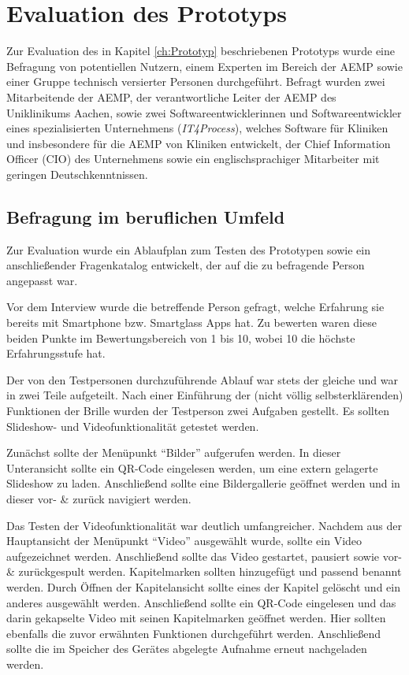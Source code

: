 %
%
%
%
%
%
\chapter{Evaluation des Prototyps}
\label{ch:Evaluation_des_Prototyps}
Zur Evaluation des in Kapitel \ref{ch:Prototyp} beschriebenen Prototyps wurde eine Befragung von potentiellen Nutzern, einem Experten im Bereich der AEMP sowie einer Gruppe technisch versierter Personen durchgeführt. Befragt wurden zwei
Mitarbeitende der AEMP, 
der verantwortliche Leiter der AEMP des Uniklinikums Aachen, 
sowie zwei Softwareentwicklerinnen und Softwareentwickler eines spezialisierten Unternehmens (\emph{IT4Process}), welches Software für Kliniken und insbesondere für die AEMP von Kliniken entwickelt, der Chief Information Officer (CIO) des Unternehmens sowie ein englischsprachiger Mitarbeiter mit geringen Deutschkenntnissen.
%
%
%
%
%
%
%
\section{Befragung im beruflichen Umfeld}
\label{sec:Befragung_im_Beruflichen_Umfeld}
Zur Evaluation wurde ein Ablaufplan zum Testen des Prototypen sowie ein anschließender Fragenkatalog entwickelt, der auf die zu befragende Person angepasst war. 

Vor dem Interview wurde die betreffende Person gefragt, welche Erfahrung sie bereits mit Smartphone bzw. Smartglass Apps hat. Zu bewerten waren diese beiden Punkte im Bewertungsbereich von 1 bis 10, wobei 10 die höchste Erfahrungsstufe hat.

Der von den Testpersonen durchzuführende Ablauf war stets der gleiche und war in zwei Teile aufgeteilt. Nach einer Einführung der (nicht völlig selbsterklärenden) Funktionen der Brille wurden der Testperson zwei Aufgaben gestellt. Es sollten Slideshow- und Videofunktionalität getestet werden. 

Zunächst sollte der Menüpunkt \enquote{Bilder} aufgerufen werden. In dieser Unteransicht sollte ein QR-Code eingelesen werden, um eine extern gelagerte Slideshow zu laden. Anschließend sollte eine Bildergallerie geöffnet werden und in dieser vor- \& zurück navigiert werden.

Das Testen der Videofunktionalität war deutlich umfangreicher. Nachdem aus der Hauptansicht der Menüpunkt \enquote{Video} ausgewählt wurde, sollte ein Video aufgezeichnet werden. Anschließend sollte das Video gestartet, pausiert sowie vor- \& zurückgespult werden. Kapitelmarken sollten hinzugefügt und passend benannt werden. Durch Öffnen der Kapitelansicht sollte eines der Kapitel gelöscht und ein anderes ausgewählt werden. Anschließend sollte ein QR-Code eingelesen und das darin gekapselte Video mit seinen Kapitelmarken geöffnet werden. Hier sollten ebenfalls die zuvor erwähnten Funktionen durchgeführt werden. Anschließend sollte die im Speicher des Gerätes abgelegte Aufnahme erneut nachgeladen werden.

